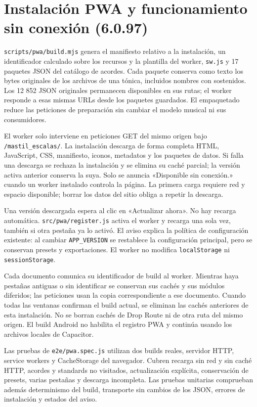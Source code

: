 \documentclass[a4paper,11pt,oneside]{report}
\begin{document}
\endgroup

\section{Instalación PWA y funcionamiento sin conexión (6.0.97)}
\label{sec:16.4}
\begingroup\sloppy
\texttt{scripts/pwa/build.mjs} genera el manifiesto relativo a la
instalación, un identificador calculado sobre los recursos y la
plantilla del worker, \texttt{sw.js} y 17 paquetes JSON del catálogo de
acordes. Cada paquete conserva como texto los bytes originales de los
archivos de una tónica, incluidos nombres con sostenidos. Los 12 852
JSON originales permanecen disponibles en sus rutas; el worker responde
a esas mismas URLs desde los paquetes guardados. El empaquetado reduce
las peticiones de preparación sin cambiar el modelo musical ni sus
consumidores.

El worker solo interviene en peticiones GET del mismo origen bajo
\texttt{/mastil\_escalas/}. La instalación descarga de forma completa
HTML, JavaScript, CSS, manifiesto, iconos, metadatos y los paquetes de
datos. Si falla una descarga se rechaza la instalación y se elimina su
caché parcial; la versión activa anterior conserva la suya. Solo se
anuncia «Disponible sin conexión.» cuando un worker instalado controla
la página. La primera carga requiere red y espacio disponible; borrar
los datos del sitio obliga a repetir la descarga.

Una versión descargada espera al clic en «Actualizar ahora». No hay
recarga automática. \texttt{src/pwa/register.js} activa el worker y
recarga una sola vez, también si otra pestaña ya lo activó. El aviso
explica la política de configuración existente: al cambiar
\texttt{APP\_VERSION} se restablece la configuración principal, pero se
conservan presets y exportaciones. El worker no modifica
\texttt{localStorage} ni \texttt{sessionStorage}.

Cada documento comunica su identificador de build al worker. Mientras
haya pestañas antiguas o sin identificar se conservan sus cachés y sus
módulos diferidos; las peticiones usan la copia correspondiente a ese
documento. Cuando todas las ventanas confirman el build actual, se
eliminan las cachés anteriores de esta instalación. No se borran cachés
de Drop Route ni de otra ruta del mismo origen. El build Android no
habilita el registro PWA y continúa usando los archivos locales de
Capacitor.

Las pruebas de \texttt{e2e/pwa.spec.js} utilizan dos builds reales,
servidor HTTP, service workers y CacheStorage del navegador. Cubren
recarga sin red y sin caché HTTP, acordes y standards no visitados,
actualización explícita, conservación de presets, varias pestañas y
descarga incompleta. Las pruebas unitarias comprueban además
determinismo del build, transporte sin cambios de los JSON, errores de
instalación y estados del aviso.
\end{document}
